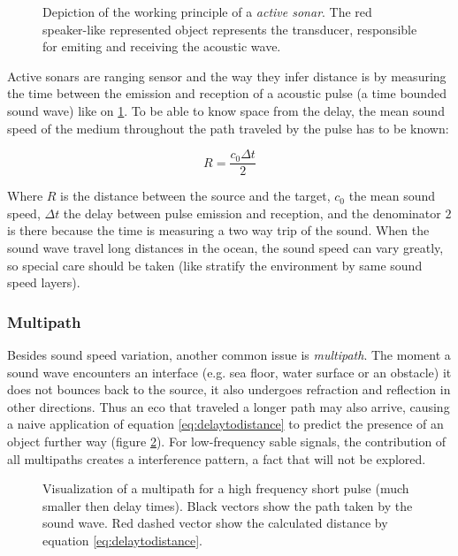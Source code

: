 \begin{figure}
	\centering
	
	\caption{Depiction of the working principle of a \textit{active sonar}. The
	red speaker-like represented object represents the transducer, responsible for
	emiting and receiving the acoustic wave.}
	\label{fig:sonar_principle}
\end{figure}

Active sonars are ranging sensor and the way they infer distance is by measuring
the time between the emission and reception of a acoustic pulse (a time bounded
sound wave) like on \ref{fig:sonar_principle}. To be able to know space from the
delay, the mean sound speed of the medium throughout the path traveled by the
pulse has to be known\cite{LURTON}:

\begin{equation}
R = \frac{c_0 \Delta t}{2}
\label{eq:delaytodistance}
\end{equation}


Where $R$ is the distance between the source and the target, $c_0$ the mean
sound speed, $\Delta t$ the delay between pulse emission and reception, and
the denominator $2$ is there because the time is measuring a two way trip of
the sound. When the sound wave travel long distances in the ocean, the sound
speed can vary greatly, so special care should be taken\cite{Etter2013} (like
stratify the environment by same sound speed layers).

\subsubsection{Multipath}

Besides sound speed variation, another common issue is \textit{multipath}. The
moment a sound wave encounters an interface (e.g. sea floor, water surface or an
obstacle) it does not bounces back to the source, it also undergoes refraction
and reflection in other directions. Thus an eco that traveled a longer path may
also arrive, causing a naive application of equation \ref{eq:delaytodistance} to
predict the presence of an object further way (figure \ref{fig:multipath}). For
low-frequency sable signals, the contribution of all multipaths creates a
interference pattern\cite{LURTON}, a fact that will not be explored. 

\begin{figure}
	\centering
	
	\caption{Visualization of a multipath for a high frequency short pulse (much
	smaller then delay times). Black vectors show the path taken by the sound
	wave. Red dashed vector show the calculated distance by equation
	\ref{eq:delaytodistance}.}
	\label{fig:multipath}
\end{figure}

